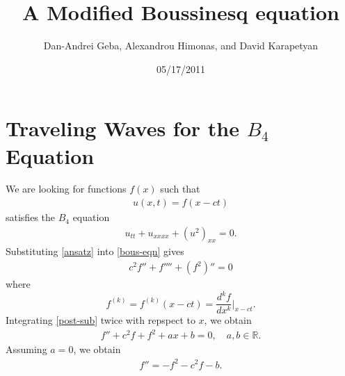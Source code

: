 \documentclass[12pt,reqno]{amsart}
\numberwithin{equation}{section}  %
\newcommand{\rr}{\mathbb{R}}
\begin{document}
\title{A Modified Boussinesq equation}
\author{Dan-Andrei Geba, Alexandrou Himonas, and David Karapetyan}
\address{Department of Mathematics, University of Rochester, Rochester, NY 14627}
\address{Department of Mathematics, University of Notre Dame, Notre Dame, IN 46556}
\address{Department of Mathematics, University of Notre Dame, Notre Dame, IN 46556}
\date{05/17/2011}
%
%
\maketitle
%
%
%
%
%
%
%
%
\section{Traveling Waves for the $B_{4}$ Equation} 
\label{sec:trav-wave}
We are looking for functions $f(x)$ such that
%
%
\begin{equation}
  \label{ansatz}
\begin{split}
u(x,t) = f(x-ct)
\end{split}
\end{equation}
%
%
satisfies the $B_{4}$ equation
%
%
\begin{equation}
  \label{bous-eqn}
\begin{split}
  u_{tt} + u_{xxxx} + (u^{2})_{xx} = 0.
\end{split}
\end{equation}
%
%
Substituting \eqref{ansatz} into \eqref{bous-eqn} gives
%
%
\begin{equation}
\begin{split}
  c^{2} f'' + f'''' + (f^{2})'' = 0
\end{split}
\label{post-sub}
\end{equation}
%
%
where $$f^{(k)} = f^{(k)}(x-ct) = \frac{d^{k}f}{dx^{k}} \Big |_{x-ct}.$$ 
Integrating \eqref{post-sub} twice with repspect to $x$, we obtain
%
%
\begin{equation}
  \label{pre-const-elim}
\begin{split}
  f'' + c^{2} f + f^{2} + ax +b = 0, \quad a,b \in \rr.
\end{split}
\end{equation}
%
%
%
%
Assuming $a = 0$, we obtain
%
\begin{equation}
  \label{2nd-order-ode-pre}
\begin{split}
  f'' = - f^{2} -c^{2} f -b.
\end{split}
\end{equation}
\end{document}
